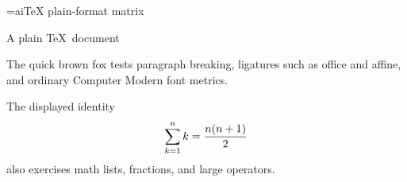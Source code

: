 
\headline={\hfil aiTeX plain-format matrix\hfil}
\centerline{A plain \TeX\ document}
\bigskip
The quick brown fox tests paragraph breaking, ligatures such as office and
affine, and ordinary Computer Modern font metrics.

The displayed identity
$$\sum_{k=1}^{n} k = {n(n+1)\over2}$$
also exercises math lists, fractions, and large operators.
\bye
